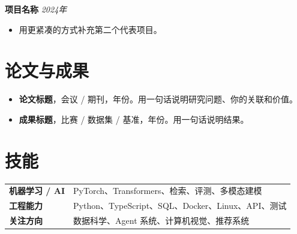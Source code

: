 \documentclass[a4paper,12pt]{article}
\begin{document}
\textbf{项目名称} \hfill \textit{2024年}\\
{\small
\begin{itemize}[leftmargin=1.2em,itemsep=2pt,topsep=3pt]
  \item 用更紧凑的方式补充第二个代表项目。
\end{itemize}
}

\section{论文与成果}
{\small
\begin{itemize}[leftmargin=1.2em,itemsep=2pt,topsep=3pt]
  \item \textbf{论文标题}，会议 / 期刊，年份。用一句话说明研究问题、你的关联和价值。
  \item \textbf{成果标题}，比赛 / 数据集 / 基准，年份。用一句话说明结果。
\end{itemize}
}

\section{技能}
\begin{tabularx}{\linewidth}{@{}l X@{}}
\textbf{机器学习 / AI} & PyTorch、Transformers、检索、评测、多模态建模 \\
\textbf{工程能力} & Python、TypeScript、SQL、Docker、Linux、API、测试 \\
\textbf{关注方向} & 数据科学、Agent 系统、计算机视觉、推荐系统 \\
\end{tabularx}
\end{document}
